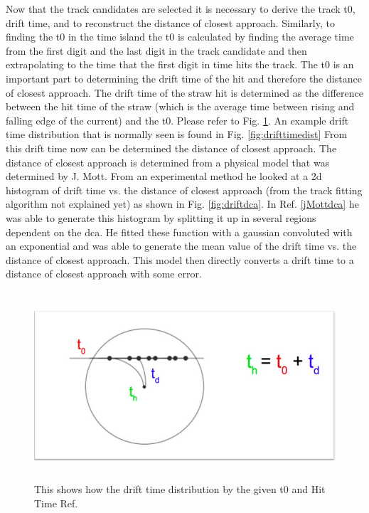 \documentclass[./Thesis]{subfiles}
\begin{document}
	
	Now that the track candidates are selected it is necessary to derive the track t0, drift time, and to reconstruct the distance of closest approach. Similarly, to finding the t0 in the time island the t0 is calculated by finding the average time from the first digit and the last digit in the track candidate and then extrapolating to the time that the first digit in time hits the track. The t0 is an important part to determining the drift time of the hit and therefore the distance of closest approach. The drift time of the straw hit is determined as the difference between the hit time of the straw (which is the average time between rising and falling edge of the current) and the t0. Please refer to Fig. \ref{fig:drifttime}. An example drift time distribution that is normally seen is found in Fig. \ref{fig:drifttimedist} From this drift time now can be determined the distance of closest approach. The distance of closest approach is determined from a physical model that was determined by J. Mott. From an experimental method he looked at a 2d histogram of drift time vs. the distance of closest approach (from the track fitting algorithm not explained yet) as shown in Fig. \ref{fig:driftdca}. In Ref. \ref{jMottdca} he was able to generate this histogram by splitting it up in several regions dependent on the dca. He fitted these function with a gaussian convoluted with an exponential and was able to generate the mean value of the drift time vs. the distance of closest approach. This model then directly converts a drift time to a distance of closest approach with some error.
	
	
\begin{figure}
	\centerline{\includegraphics[height=70mm]{drifttime.jpeg}}
	\caption[Drift Time Determination]{ This shows how the drift time distribution by the given t0 and Hit Time  Ref. \cite{trackerWiki}
	}
	\label{fig:drifttime}
\end{figure} 
	
\end{document}
